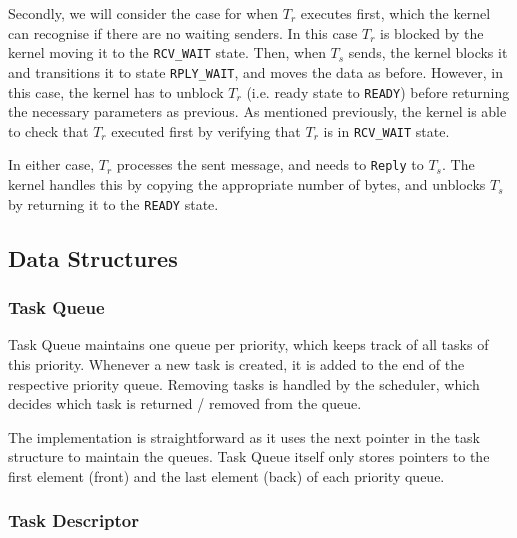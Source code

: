 \documentclass[12pt, titlepage]{article}
\begin{document}
    Secondly, we will consider the case for when $T_r$ executes first, which the kernel can recognise if there are no waiting senders. In this case $T_r$ is blocked by the kernel moving it to the \verb`RCV_WAIT` state. Then, when $T_s$ sends, the kernel blocks it and transitions it to state \verb`RPLY_WAIT`, and moves the data as before. However, in this case, the kernel has to unblock $T_r$ (i.e. ready state to \verb`READY`) before returning the necessary parameters as previous. As mentioned previously, the kernel is able to check that $T_r$ executed first by verifying that $T_r$ is in \verb`RCV_WAIT` state.

    In either case, $T_r$ processes the sent message, and needs to \verb`Reply` to $T_s$. The kernel handles this by copying the appropriate number of bytes, and unblocks $T_s$ by returning it to the \verb`READY` state.

    \subsection{Data Structures}

    \subsubsection{Task Queue}
    \label{sec:task-queue}

    Task Queue maintains one queue per priority, which keeps track of all tasks of this priority.
    Whenever a new task is created, it is added to the end of the respective priority queue.
    Removing tasks is handled by the scheduler, which decides which task is returned / removed from the queue.

    The implementation is straightforward as it uses the next pointer in the task structure to maintain the queues.
    Task Queue itself only stores pointers to the first element (front) and the last element (back) of each priority queue.

    \subsubsection{Task Descriptor}
\end{document}
